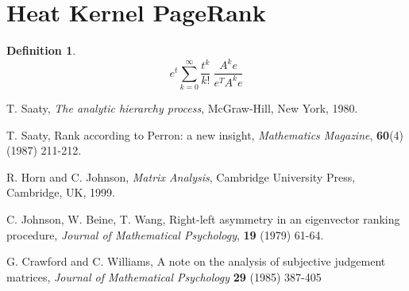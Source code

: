 \documentclass[a4,11pt,twoside,leqno]{report}
\theoremstyle{definition}
\newtheorem{defn}[thm]{Definition}
\theoremstyle{remark}
\numberwithin{equation}{section}
\begin{document}
\section{Heat Kernel PageRank}

\begin{defn} 

$$e^t \displaystyle \sum_{k=0}^{\infty} \frac{t^k}{k!} \ \frac{A^ke}{e^TA^ke}$$

\end{defn}

\begin{thebibliography}{1}

   T. Saaty, {\em The analytic hierarchy process}, McGraw-Hill, New York, 1980. 
  
   T. Saaty, Rank according to Perron: a new insight, {\em Mathematics Magazine}, {\bf 60}(4) (1987) 211-212.

   R. Horn and C. Johnson, {\em Matrix Analysis}, Cambridge University Press, Cambridge, UK, 1999.

   C. Johnson, W. Beine, T. Wang, Right-left asymmetry in an eigenvector ranking procedure, {\em Journal of Mathematical Psychology}, {\bf 19} (1979) 61-64.
  
   G. Crawford and C. Williams, A note on the analysis of subjective judgement matrices, {\em Journal of Mathematical Psychology} {\bf 29} (1985) 387-405
  
  
  
  
  
  
   
  




  \end{thebibliography}
\end{document}

